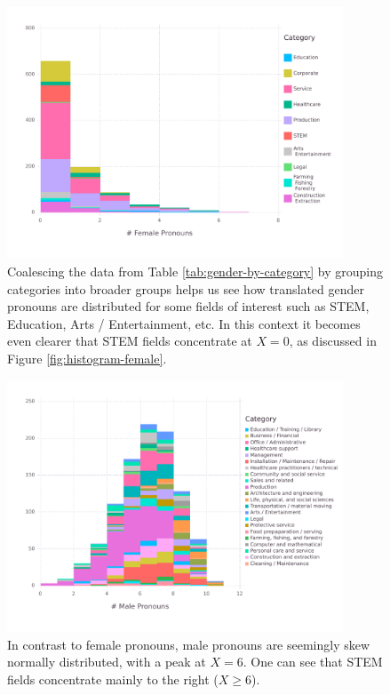 \documentclass[fleqn,10pt]{article}
\begin{document}
\begin{figure}[H]
	\centering
	\includegraphics[width=10cm]{pictures/histogram-female-grouped}
	\caption{Coalescing the data from Table \ref{tab:gender-by-category} by grouping categories into broader groups helps us see how translated gender pronouns are distributed for some fields of interest such as STEM, Education, Arts / Entertainment, etc. In this context it becomes even clearer that STEM fields concentrate at $X = 0$, as discussed in Figure \ref{fig:histogram-female}.}
	\label{fig:histogram-female-grouped}
\end{figure}

\begin{figure}[H]
	\centering
	\includegraphics[width=10cm]{pictures/histogram-male}
	\caption{In contrast to female pronouns, male pronouns are seemingly skew normally distributed, with a peak at $X = 6$. One can see that STEM fields concentrate mainly to the right ($X \geq 6$).}
	\label{fig:histogram-male}
\end{figure}
\end{document}
